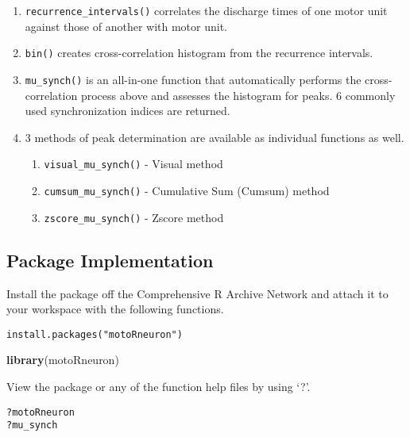 \documentclass[]{article}
\newenvironment{Shaded}{\begin{snugshade}}{\end{snugshade}}
\newcommand{\KeywordTok}[1]{\textcolor[rgb]{0.13,0.29,0.53}{\textbf{#1}}}
\newcommand{\NormalTok}[1]{#1}
\providecommand{\tightlist}{%
  \setlength{\itemsep}{0pt}\setlength{\parskip}{0pt}}
\begin{document}
\begin{enumerate}
\def\labelenumi{\arabic{enumi})}
\tightlist
\item
  \texttt{recurrence\_intervals()} correlates the discharge times of one
  motor unit against those of another with motor unit.
\item
  \texttt{bin()} creates cross-correlation histogram from the recurrence
  intervals.
\item
  \texttt{mu\_synch()} is an all-in-one function that automatically
  performs the cross-correlation process above and assesses the
  histogram for peaks. 6 commonly used synchronization indices are
  returned.
\item
  3 methods of peak determination are available as individual functions
  as well.

  \begin{enumerate}
  \def\labelenumii{\arabic{enumii})}
  \tightlist
  \item
    \texttt{visual\_mu\_synch()} - Visual method
  \item
    \texttt{cumsum\_mu\_synch()} - Cumulative Sum (Cumsum) method
  \item
    \texttt{zscore\_mu\_synch()} - Zscore method
  \end{enumerate}
\end{enumerate}

\subsection{Package Implementation}\label{package-implementation}

Install the package off the Comprehensive R Archive Network and attach
it to your workspace with the following functions.

\begin{verbatim}
install.packages("motoRneuron")
\end{verbatim}

\begin{Shaded}
\begin{Highlighting}[]
\KeywordTok{library}\NormalTok{(motoRneuron)}
\end{Highlighting}
\end{Shaded}

View the package or any of the function help files by using `?'.

\begin{verbatim}
?motoRneuron
?mu_synch
\end{verbatim}
\end{document}
